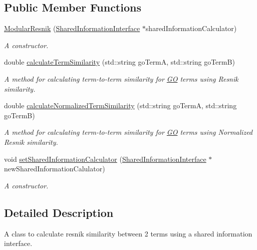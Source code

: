 \subsection*{Public Member Functions}
\begin{DoxyCompactItemize}
\item 
\hyperlink{classModularResnik_a53d184cbe8caf8222455808b03fdc5c9}{Modular\+Resnik} (\hyperlink{classSharedInformationInterface}{Shared\+Information\+Interface} $\ast$shared\+Information\+Calculator)
\begin{DoxyCompactList}\small\item\em A constructor. \end{DoxyCompactList}\item 
double \hyperlink{classModularResnik_a78b925c1aadb000d1773ffdacad549df}{calculate\+Term\+Similarity} (std\+::string go\+TermA, std\+::string go\+TermB)
\begin{DoxyCompactList}\small\item\em A method for calculating term-\/to-\/term similarity for \hyperlink{namespaceGO}{GO} terms using Resnik similarity. \end{DoxyCompactList}\item 
double \hyperlink{classModularResnik_aba93eb85400287057037d545e5080265}{calculate\+Normalized\+Term\+Similarity} (std\+::string go\+TermA, std\+::string go\+TermB)
\begin{DoxyCompactList}\small\item\em A method for calculating term-\/to-\/term similarity for \hyperlink{namespaceGO}{GO} terms using Normalized Resnik similarity. \end{DoxyCompactList}\item 
void \hyperlink{classModularResnik_ab0402a3be9f5b1e590c50b38e4a7fd39}{set\+Shared\+Information\+Calculator} (\hyperlink{classSharedInformationInterface}{Shared\+Information\+Interface} $\ast$new\+Shared\+Information\+Calulator)
\begin{DoxyCompactList}\small\item\em A constructor. \end{DoxyCompactList}\end{DoxyCompactItemize}


\subsection{Detailed Description}
A class to calculate resnik similarity between 2 terms using a shared information interface. 


